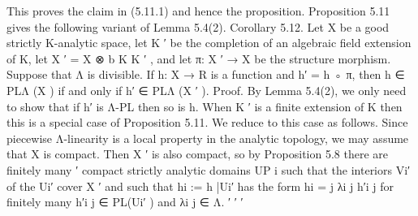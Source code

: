 \documentclass[
  10pt,
]{article}
\newenvironment{Shaded}{}{}
\newcommand{\NormalTok}[1]{#1}
\begin{document}
\begin{Shaded}
\begin{Highlighting}[]
\NormalTok{This proves the claim in (5.11.1) and hence the proposition.                                      }
\NormalTok{     Proposition 5.11 gives the following variant of Lemma 5.4(2).}
\NormalTok{Corollary 5.12. Let X be a good strictly K{-}analytic space, let K ′ be the completion of an}
\NormalTok{algebraic field extension of K, let X ′ = X ⊗}
\NormalTok{                                            b K K ′ , and let π: X ′ → X be the structure morphism.}
\NormalTok{Suppose that Λ is divisible. If h: X → R is a function and h′ = h ◦ π, then h ∈ PLΛ (X ) if and}
\NormalTok{only if h′ ∈ PLΛ (X ′ ).}
\NormalTok{Proof. By Lemma 5.4(2), we only need to show that if h′ is Λ{-}PL then so is h. When K ′}
\NormalTok{is a finite extension of K then this is a special case of Proposition 5.11. We reduce to this}
\NormalTok{case as follows.}
\NormalTok{    Since piecewise Λ{-}linearity is a local property in the analytic topology, we may assume}
\NormalTok{that X is compact. Then X ′ is also compact, so by Proposition 5.8 there are finitely many}
\NormalTok{                                       ′}
\NormalTok{compact strictly analytic domains UP   i}
\NormalTok{                                         such that the interiors Vi′ of the Ui′ cover X ′ and such}
\NormalTok{that hi := h |Ui′ has the form hi = j λi j h′i j for finitely many h′i j ∈ PL(Ui′ ) and λi j ∈ Λ.}
\NormalTok{        ′      ′                   ′}


\end{Highlighting}
\end{Shaded}
\end{document}
